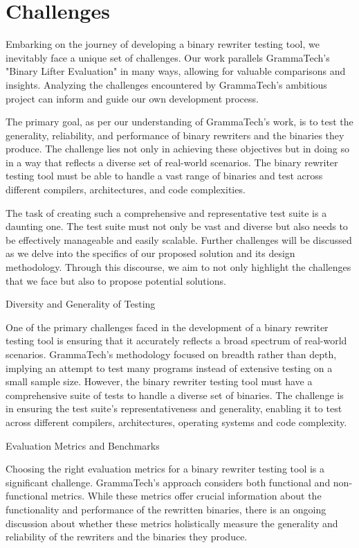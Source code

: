\documentclass[a4paper,11pt,oneside]{report}
\begin{document}
\chapter{Challenges}

\setlength{\parindent}{4em}
Embarking on the journey of developing a binary rewriter testing tool, we inevitably
face a unique set of challenges. Our work parallels GrammaTech's "Binary Lifter Evaluation"
in many ways, allowing for valuable comparisons and insights. Analyzing the challenges
encountered by GrammaTech's ambitious project can inform and guide our own
development process.

The primary goal, as per our understanding of GrammaTech's work, is to test the
generality, reliability, and performance of binary rewriters and the binaries they produce.
The challenge lies not only in achieving these objectives but in doing so in a way that reflects
a diverse set of real-world scenarios. The binary rewriter testing tool must be able to handle
a vast range of binaries and test across different compilers, architectures, and code
complexities.

The task of creating such a comprehensive and representative test suite is a daunting
one. The test suite must not only be vast and diverse but also needs to be effectively
manageable and easily scalable. Further challenges will be discussed as we delve into the
specifics of our proposed solution and its design methodology. Through this discourse, we
aim to not only highlight the challenges that we face but also to propose potential solutions.

Diversity and Generality of Testing

One of the primary challenges faced in the development of a binary rewriter testing
tool is ensuring that it accurately reflects a broad spectrum of real-world scenarios.
GrammaTech's methodology focused on breadth rather than depth, implying an attempt to
test many programs instead of extensive testing on a small sample size. However, the binary
rewriter testing tool must have a comprehensive suite of tests to handle a diverse set of
binaries. The challenge is in ensuring the test suite's representativeness and generality,
enabling it to test across different compilers, architectures, operating systems and code
complexity.

Evaluation Metrics and Benchmarks

Choosing the right evaluation metrics for a binary rewriter testing tool is a significant
challenge. GrammaTech's approach considers both functional and non-functional metrics.
While these metrics offer crucial information about the functionality and performance of
the rewritten binaries, there is an ongoing discussion about whether these metrics
holistically measure the generality and reliability of the rewriters and the binaries they
produce.
\end{document}
